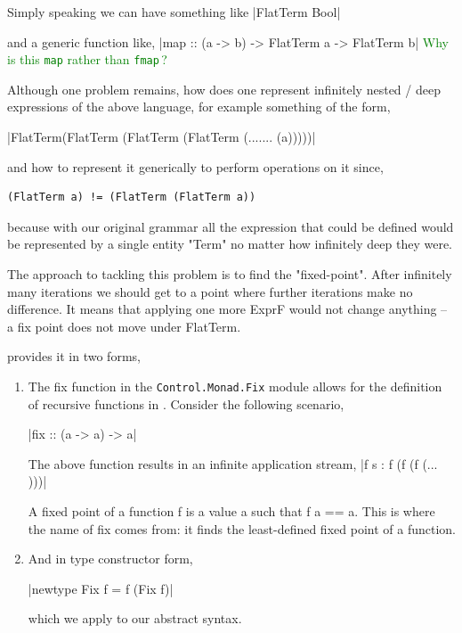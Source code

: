 \documentclass[thesis-solanki.tex]{subfiles}
\begin{document}
Simply speaking we can have something like 
|FlatTerm Bool|

and a generic function like,
|map :: (a -> b) -> FlatTerm a -> FlatTerm b|
\textcolor{green}{%
  Why is this {\color{blue}\Verb|map|} rather than {\color{blue}\Verb|fmap|}\,?
}

Although one problem remains, how does one represent infinitely nested / deep expressions of the above language, for example something of
the form,

|FlatTerm(FlatTerm (FlatTerm (FlatTerm (....... (a)))))|

and how to represent it generically to perform operations on it since,
\begin{verbatim}
(FlatTerm a) != (FlatTerm (FlatTerm a))
\end{verbatim}

because with our original grammar all the expression that could be defined would be represented by a single entity "Term" no matter how 
infinitely deep they were.

The approach to tackling this problem is to find the "fixed-point". After infinitely many iterations we should get to a  point where
further iterations make no difference. It means that applying one more ExprF would not change anything – a fix point does not move under 
FlatTerm. 

 provides it in two forms,
\begin{enumerate}

\item The fix function in the \texttt{Control.Monad.Fix} module allows for the definition of recursive functions in . Consider the following scenario,

|fix :: (a -> a) -> a|

The above function results in an infinite application stream,
|f s : f (f (f (... )))|

A fixed point of a function f is a value a such that f a == a. This is where the name of fix comes from: it finds the least-defined fixed 
point of a function.

\item And in type constructor form,

|newtype Fix f = f (Fix f)| 

which we apply to our abstract syntax.

\end{enumerate}
\end{document}
